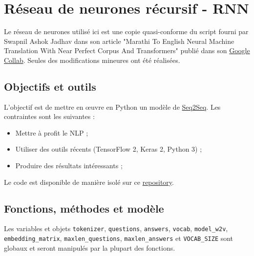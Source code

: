 \documentclass[10pt,a4paper]{article}
\newcommand\tab[1][0.5cm]{\hspace*{#1}}
\begin{document}
\section{Réseau de neurones récursif - RNN}
Le réseau de neurones utilisé ici est une copie quasi-conforme du script fourni par Swapnil Ashok Jadhav dans son article "Marathi To English Neural Machine Translation With Near Perfect Corpus And Transformers" publié dans son \href{https://colab.research.google.com/drive/11os3isH4I4X76dwOAQJ5cSRnfhmUziHm#scrollTo=dHBP5xzmrM4U}{Google Collab}. Seules des modifications mineures ont été réalisées.
\subsection{Objectifs et outils}
L'objectif est de mettre en œuvre en Python un modèle de \href{https://arxiv.org/abs/1409.3215}{Seq2Seq}. Les contraintes sont les suivantes :
\begin{itemize}
	\item Mettre à profit le NLP ;
	\item Utiliser des outils récents (TensorFlow 2, Keras 2, Python 3) ;
	\item Produire des résultats intéressants ;
\end{itemize}
\tab Le code est disponible de manière isolé sur ce \href{https://github.com/LaraProject/seq2seq}{repository}.
\subsection{Fonctions, méthodes et modèle}
Les variables et objets \texttt{tokenizer}, \texttt{questions}, \texttt{answers}, \texttt{vocab}, \texttt{model\_w2v}, \texttt{embedding\_matrix}, \texttt{maxlen\_questions}, \texttt{maxlen\_answers} et \texttt{VOCAB\_SIZE} sont globaux et seront manipulés par la plupart des fonctions.
\end{document}
